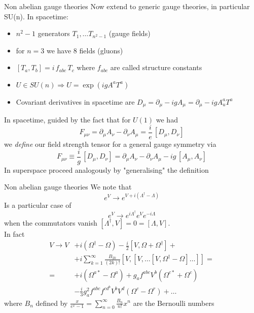\documentclass[10pt]{beamer}
\begin{document}
\begin{frame}{Non abelian gauge theories}
Now extend to generic gauge theories, in particular SU(n). In spacetime:
\begin{itemize}
    \item $n^2-1$ generators $T_{1}, \dots T_{n^2-1}$ (gauge fields)
    \item for $n=3$ we have 8 fields (gluons)
    \item $\left[T_a, T_b\right] = i \, f_{abc} \, T_c$ where $f_{abc}$ are called structure constants
    \item $U \in SU(n) \Rightarrow U = \exp(i g A^a T^a)$
    \item Covariant derivatives  in spacetime are $D_\mu = \partial_\mu - ig A_\mu = \partial_\mu - igA_u^a T^a$
\end{itemize}
In spacetime, guided by the fact that for $U(1)$ we had $$F_{\mu\nu} = \partial_\mu A_\nu - \partial_\nu A_\mu = \frac{i}{e} \, [D_\mu, D_\nu]$$
we \emph{define} our field strength tensor for a general gauge symmetry via 
\begin{equation*} 
    F_{\mu \nu} \equiv \frac{i}{g} \, [D_\mu, D_\nu] = \partial_\mu A_\nu - \partial_\nu A_\mu -ig \, [A_\mu, A_\nu]
\end{equation*}
In superspace proceed analogously by "generalising" the definition
\end{frame}

\begin{frame}{Non abelian gauge theories}
    We note that 
    \begin{equation*} 
        e^V \to e^{V + i(\Lambda^\dagger - \Lambda)}
    \end{equation*}
    Is a particular case of 
    \begin{equation*}
        e^V \to e^{i\Lambda^\dagger} e^V e^{-i\Lambda}
    \end{equation*}
    when the commutators vanish $[\Lambda^\dagger, V] = 0 = [\Lambda, V]$. \\
    In fact
    \begin{align*}
        V \rightarrow V &+ i\left(\Omega^{\dagger}-\Omega\right)-\frac{i}{2}\left[V, \Omega+\Omega^{\dagger}\right] + \\ 
        &+ i \sum_{k=1}^{\infty} \frac{B_{2 k}}{(2 k) !}\left[V,\left[V, \ldots\left[V, \Omega^{\dagger}-\Omega\right] \ldots\right]\right] = \\
        = &+ i\left(\Omega^{a *}-\Omega^{a}\right)+g_{a} f^{a b c} V^{b}\left(\Omega^{c *}+\Omega^{c}\right) \\ 
        &-\frac{i}{3} g_{a}^{2} f^{a b c} f^{c d^{b}} V^{b} V^{d}\left(\Omega^{c}-\Omega^{r}\right)+\ldots
    \end{align*}
    where $B_n$ defined by $\frac{x}{e^{x}-1}=\sum_{n=0}^{\infty} \frac{B_{n}}{n !} x^{n}$ are the Bernoulli numbers
\end{frame}
\end{document}
